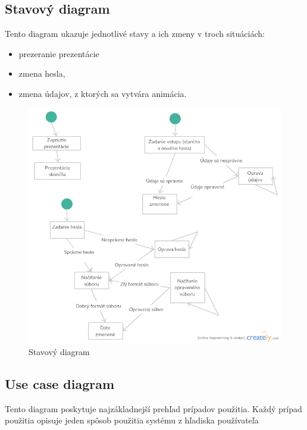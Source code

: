 \documentclass[12pt,a4paper]{report}
\begin{document}
\subsection[Stavový diagram]{\rmfamily\bfseries
	Stavový diagram}
Tento diagram ukazuje jednotlivé stavy a ich zmeny v troch situáciách:
\begin{itemize}
	\item prezeranie prezentácie
	\item zmena hesla,
	\item zmena údajov, z ktorých sa vytvára animácia.
\end{itemize}
\begin{figure}[htb]
	\centering
	\includegraphics[scale=0.5]{Stavovy_diagram}
	\caption{Stavový diagram}
	\label{fig:Stavový diagram}
\end{figure}
\FloatBarrier
\clearpage
\subsection[Use case diagram]{\rmfamily\bfseries
	Use case diagram}
Tento diagram poskytuje najzákladnejší prehľad prípadov použitia. Každý prípad použitia opisuje jeden spôsob použitia systému z hľadiska používateľa
\end{document}

